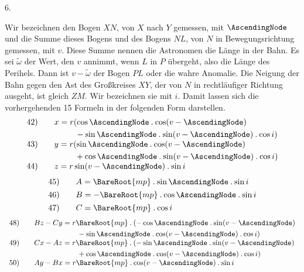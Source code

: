 \par{}\bigskip
{}
\begin{center}6.\end{center}
\noindent\hspace*{\parindent}Wir bezeichnen den Bogen \(XN\), von \(X\) nach \(Y\) gemessen, mit \(\AscendingNode\) und die Summe dieses Bogens und des Bogens \(NL\), von \(N\) in Bewegungsrichtung gemessen, mit \(v\). Diese Summe nennen die Astronomen die Länge in der Bahn. Es sei \(\tilde\omega\) der Wert, den \(v\) annimmt, wenn \(L\) in \(P\) übergeht, also die Länge des Perihels. Dann ist \(v-\tilde\omega\) der Bogen \(PL\) oder die wahre Anomalie. Die Neigung der Bahn gegen den Ast des Großkreises \(XY\), der von \(N\) in rechtläufiger Richtung ausgeht, ist gleich \(ZM\). Wir bezeichnen sie mit \(i\). Damit lassen sich die vorhergehenden 15 Formeln in der folgenden Form darstellen.
\[
\begin{array}{rl}
42)\quad&\begin{aligned}[t]x&=r(\cos\AscendingNode\mathbin{.}\cos(v-\AscendingNode)\\&\qquad-\sin\AscendingNode\mathbin{.}\sin(v-\AscendingNode)\mathbin{.}\cos i)\end{aligned}\\[5pt]
43)\quad&\begin{aligned}[t]y&=r(\sin\AscendingNode\mathbin{.}\cos(v-\AscendingNode)\\&\qquad+\cos\AscendingNode\mathbin{.}\sin(v-\AscendingNode)\mathbin{.}\cos i)\end{aligned}\\[5pt]
44)\quad&z=r\sin(v-\AscendingNode)\mathbin{.}\sin i
\end{array}
\]
\[
\begin{array}{rl}
45)\quad&A=\BareRoot{mp}\mathbin{.}\sin\AscendingNode\mathbin{.}\sin i\\[4pt]
46)\quad&B=-\BareRoot{mp}\mathbin{.}\cos\AscendingNode\mathbin{.}\sin i\\[4pt]
47)\quad&C=\BareRoot{mp}\mathbin{.}\cos i
\end{array}
\]
\[
\begin{array}{rl}
48)\quad&\begin{aligned}[t]Bz-Cy&=r\BareRoot{mp}\mathbin{.}(-\cos\AscendingNode\mathbin{.}\sin(v-\AscendingNode)\\&\qquad-\sin\AscendingNode\mathbin{.}\cos(v-\AscendingNode)\mathbin{.}\cos i)\end{aligned}\\[5pt]
49)\quad&\begin{aligned}[t]Cx-Az&=r\BareRoot{mp}\mathbin{.}(-\sin\AscendingNode\mathbin{.}\sin(v-\AscendingNode)\\&\qquad+\cos\AscendingNode\mathbin{.}\cos(v-\AscendingNode)\mathbin{.}\cos i)\end{aligned}\\[5pt]
50)\quad&Ay-Bx=r\BareRoot{mp}\mathbin{.}\cos(v-\AscendingNode)\mathbin{.}\sin i
\end{array}
\]
